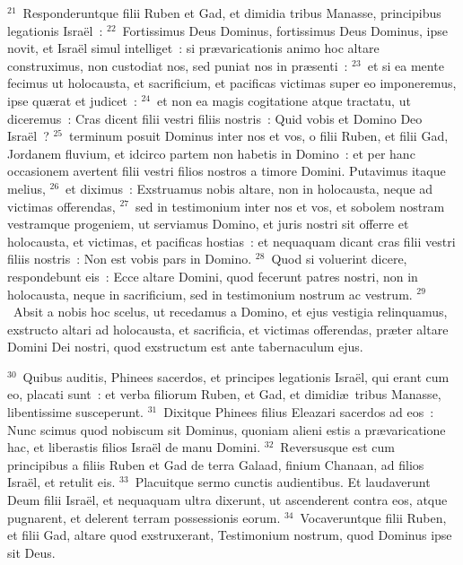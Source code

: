 ${}^{21}$~Responderuntque filii Ruben et Gad, et dimidia tribus Manasse, principibus legationis Isra\"el~:
${}^{22}$~Fortissimus Deus Dominus, fortissimus Deus Dominus, ipse novit, et Isra\"el simul intelliget~: si pr\ae varicationis animo hoc altare construximus, non custodiat nos, sed puniat nos in pr\ae senti~:
${}^{23}$~et si ea mente fecimus ut holocausta, et sacrificium, et pacificas victimas super eo imponeremus, ipse qu\ae rat et judicet~:
${}^{24}$~et non ea magis cogitatione atque tractatu, ut diceremus~: Cras dicent filii vestri filiis nostris~: Quid vobis et Domino Deo Isra\"el~?
${}^{25}$~terminum posuit Dominus inter nos et vos, o filii Ruben, et filii Gad, Jordanem fluvium, et idcirco partem non habetis in Domino~: et per hanc occasionem avertent filii vestri filios nostros a timore Domini. Putavimus itaque melius,
${}^{26}$~et diximus~: Exstruamus nobis altare, non in holocausta, neque ad victimas offerendas,
${}^{27}$~sed in testimonium inter nos et vos, et sobolem nostram vestramque progeniem, ut serviamus Domino, et juris nostri sit offerre et holocausta, et victimas, et pacificas hostias~: et nequaquam dicant cras filii vestri filiis nostris~: Non est vobis pars in Domino.
${}^{28}$~Quod si voluerint dicere, respondebunt eis~: Ecce altare Domini, quod fecerunt patres nostri, non in holocausta, neque in sacrificium, sed in testimonium nostrum ac vestrum.
${}^{29}$~Absit a nobis hoc scelus, ut recedamus a Domino, et ejus vestigia relinquamus, exstructo altari ad holocausta, et sacrificia, et victimas offerendas, pr\ae ter altare Domini Dei nostri, quod exstructum est ante tabernaculum ejus.


${}^{30}$~Quibus auditis, Phinees sacerdos, et principes legationis Isra\"el, qui erant cum eo, placati sunt~: et verba filiorum Ruben, et Gad, et dimidi\ae\ tribus Manasse, libentissime susceperunt.
${}^{31}$~Dixitque Phinees filius Eleazari sacerdos ad eos~: Nunc scimus quod nobiscum sit Dominus, quoniam alieni estis a pr\ae varicatione hac, et liberastis filios Isra\"el de manu Domini.
${}^{32}$~Reversusque est cum principibus a filiis Ruben et Gad de terra Galaad, finium Chanaan, ad filios Isra\"el, et retulit eis.
${}^{33}$~Placuitque sermo cunctis audientibus. Et laudaverunt Deum filii Isra\"el, et nequaquam ultra dixerunt, ut ascenderent contra eos, atque pugnarent, et delerent terram possessionis eorum.
${}^{34}$~Vocaveruntque filii Ruben, et filii Gad, altare quod exstruxerant, Testimonium nostrum, quod Dominus ipse sit Deus.

